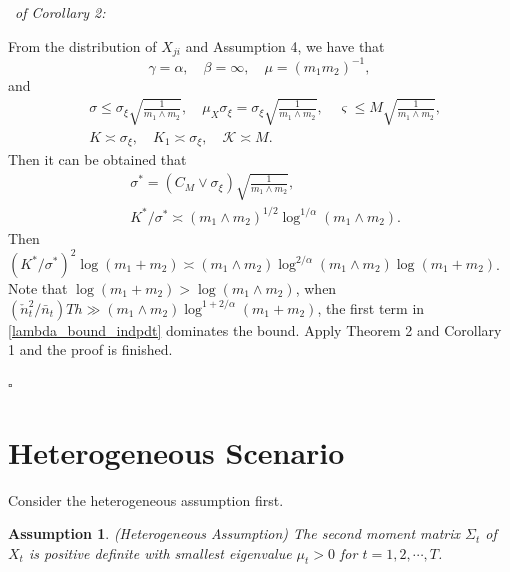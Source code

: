 \documentclass[12pt]{article}
\newtheorem{assump}{Assumption}
\newenvironment{pf}{{\noindent\it Proof}\ }{\hfill $\square$\par}
\begin{document}
\begin{pf}{\it of Corollary 2:}

  From the distribution of $X_{ji}$ and Assumption 4, we have that
  $$\gamma=\alpha,\quad\beta=\infty,\quad\mu=(m_1m_2)^{-1},$$
  and 
  \begin{align*}
  & \sigma\le \sigma_\xi\sqrt{\frac{1}{m_1\wedge m_2}},\quad \mu_X\sigma_\xi= \sigma_\xi\sqrt{\frac{1}{m_1\wedge m_2}},\quad\varsigma\le M\sqrt{\frac{1}{m_1\wedge m_2}},\\
  &   K\asymp\sigma_\xi,\quad K_1\asymp \sigma_\xi,\quad \mathcal{K}\asymp M.
  \end{align*}
  Then it can be obtained that
  \begin{align*}
  &\sigma^* = (C_M\vee \sigma_\xi)\sqrt{\frac{1}{m_1\wedge m_2}},\\ 
  &K^*/\sigma^* \asymp (m_1\wedge m_2)^{1/2}\log^{1/\alpha}(m_1\wedge m_2).
  \end{align*}
  Then $(K^*/\sigma^*)^2\log(m_1+m_2)\asymp(m_1\wedge m_2)\log^{2/\alpha}(m_1\wedge m_2)\log(m_1+m_2)$.
  Note that $\log(m_1+m_2)>\log(m_1\wedge m_2)$, when $(\check{n}_t^2/\bar{n}_t) T h\gg (m_1\wedge m_2)\log^{1+2/\alpha}(m_1+m_2)$, the first term in \eqref{lambda_bound_indpdt} dominates the bound. Apply Theorem 2 and Corollary 1 and the proof is finished.
  
\end{pf}

\section{Heterogeneous Scenario}
\label{supp:hetero}
Consider the heterogeneous assumption first.
\begin{assump}
\label{assump_hete}
(Heterogeneous Assumption)
The second moment matrix $\Sigma_t$ of $X_t$ is positive definite with smallest eigenvalue $\mu_t > 0$ for $t=1,2,\cdots,T$.
\end{assump}
\end{document}
